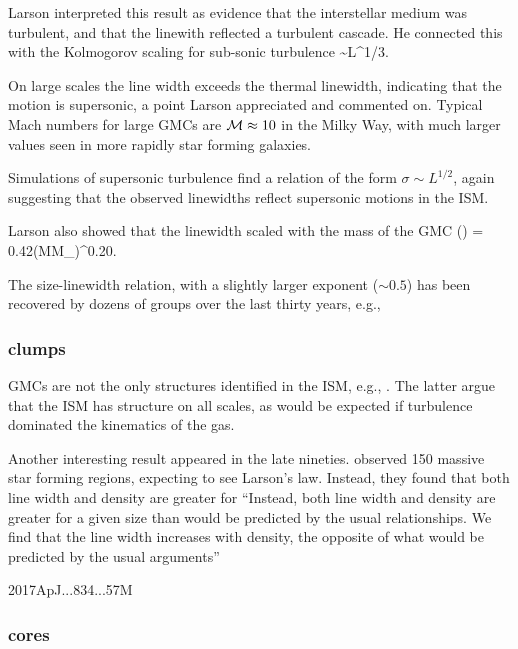 \documentclass[../dissertation.tex]{subfiles}
\begin{document}
Larson interpreted this result as evidence that the interstellar medium was turbulent, and that the linewith reflected a turbulent cascade. 
He connected this with the Kolmogorov scaling for sub-sonic turbulence
%
\be
\sigma\sim L^{1/3}.
\ee
%

On large scales the line width exceeds the thermal linewidth, indicating that the motion is supersonic, a point Larson appreciated and commented on. Typical Mach numbers for large GMCs are ${\cal M}\approx 10$ in the Milky Way, with much larger values seen in more rapidly star forming galaxies.

Simulations of supersonic turbulence find a relation of the form $\sigma\sim L^{1/2}$, again suggesting that the observed linewidths reflect supersonic motions in the ISM.

Larson also showed that the linewidth scaled with the mass of the GMC
%
\be
\left({\sigma\over \kms}\right) = 0.42\left({M\over M_\odot}\right)^{0.20}.
\ee
%

The size-linewidth relation, with a slightly larger exponent ($\sim0.5$) has been recovered by dozens of groups over the last thirty years, e.g., \citet{1987ApJ...319..730S,2008ApJ...679.1338R,2017ApJ...834...57M} 

\subsubsection{clumps}
GMCs are not the only structures identified in the ISM, e.g., \citet{2000prpl.conf...97W}. The latter argue that the ISM has structure on all scales, as would be expected if turbulence dominated the kinematics of the gas.

\citet{1992ApJ...396..631M}%



Another interesting result appeared in the late nineties. 
\citet{1997ApJ...476..730P} observed 150 massive star forming regions, expecting to see Larson's law. 
Instead, they found that both line width and density are greater for 
``Instead, both line width and density are greater for a given size than would be predicted by the usual relationships. We find that the line width increases with density, the opposite of what would be predicted by the usual arguments''


2017ApJ...834...57M

\subsubsection{cores}
\end{document}
